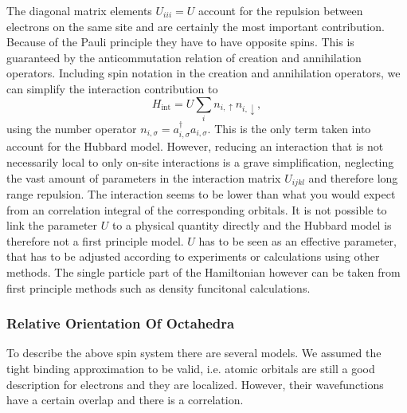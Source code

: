 \documentclass[a4paper,10pt]{report}
\begin{document}
The diagonal matrix elements $U_{iii} = U$ account for the repulsion between electrons on the same site and are certainly the most important contribution.
Because of the Pauli principle they have to have opposite spins. 
This is guaranteed by the anticommutation relation of creation and annihilation operators.
Including spin notation in the creation and annihilation operators, we can simplify the interaction contribution to 
\begin{equation}
 H_{\text{int}} = U \sum_i n_{i,\uparrow} n_{i,\downarrow},
\end{equation}
using the number operator $n_{i,\sigma} = a^{\dagger}_{i,\sigma} a_{i,\sigma}$.
This is the only term taken into account for the Hubbard model.
However, reducing an interaction that is not necessarily local to only on-site interactions is a grave simplification, 
neglecting the vast amount of parameters in the interaction matrix $U_{ijkl}$ and therefore long range repulsion.
The interaction seems to be lower than what you would expect from an correlation integral of the corresponding orbitals.
It is not possible to link the parameter $U$ to a physical quantity directly
and the Hubbard model is therefore not a first principle model. $U$ has to be seen as an effective parameter, that has to be adjusted according to experiments or calculations using
other methods.
The single particle part of the Hamiltonian however can be taken from first principle methods such as density funcitonal calculations.













\subsubsection{Relative Orientation Of Octahedra}




To describe the above spin system there are several models. We assumed the tight binding approximation to be valid, i.e. atomic orbitals
are still a good description for electrons and they are localized. However, their wavefunctions have a certain overlap and there is a correlation. 
\end{document}
